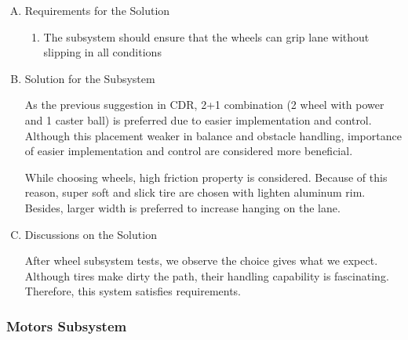 \documentclass[a4paper,12pt]{article}
\begin{document}
\begin{enumerate}[A.]

\item {Requirements for the Solution}


\begin{enumerate}[1)]

\item The subsystem should ensure that the wheels can grip lane without slipping in all conditions 

\end{enumerate}



\item {Solution for the Subsystem}


As the previous suggestion in CDR, 2+1 combination (2 wheel with power and 1 caster ball) is preferred due to easier implementation and control. Although this placement weaker in balance and obstacle handling, importance of easier implementation and control are considered more beneficial. 

While choosing wheels, high friction property is considered. Because of this reason, super soft and slick tire are chosen with lighten aluminum rim. Besides, larger width is preferred to increase hanging on the lane.      



\item {Discussions on the Solution}


After wheel subsystem tests, we observe the choice gives what we expect. Although tires make dirty the path, their handling capability is fascinating. Therefore, this system satisfies requirements.


\end{enumerate}





\subsubsection{Motors Subsystem}
\end{document}
